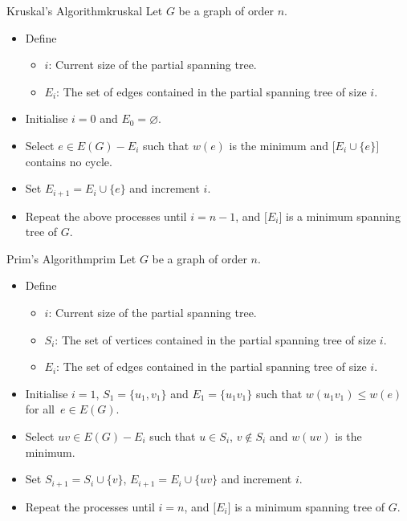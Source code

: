 \documentclass[math]{amznotes}
\theoremstyle{remark}
\newcommand{\0}{\mathbf{0}}
\newcommand{\1}{\mathbf{1}}
\begin{document}
\begin{tecbox}{Kruskal's Algorithm}{kruskal}
    Let $G$ be a graph of order $n$. 
    \begin{itemize}
        \item Define 
        \begin{itemize}
            \item $i$: Current size of the partial spanning tree.
            \item $E_i$: The set of edges contained in the partial spanning tree of size $i$.
        \end{itemize}
        \item Initialise $i = 0$ and $E_0 = \varnothing$.
        \item Select $e \in E(G) - E_i$ such that $w(e)$ is the minimum and $\bigl[E_i \cup \{e\}\bigr]$ contains no cycle.
        \item Set $E_{i + 1} = E_i \cup \{e\}$ and increment $i$.
        \item Repeat the above processes until $i = n - 1$, and $\bigl[E_i\bigr]$ is a minimum spanning tree of $G$.
    \end{itemize}
\end{tecbox}
\begin{tecbox}{Prim's Algorithm}{prim}
    Let $G$ be a graph of order $n$. 
    \begin{itemize}
        \item Define 
        \begin{itemize}
            \item $i$: Current size of the partial spanning tree.
            \item $S_i$: The set of vertices contained in the partial spanning tree of size $i$.
            \item $E_i$: The set of edges contained in the partial spanning tree of size $i$.
        \end{itemize}
        \item Initialise $i = 1$, $S_1 = \{u_1, v_1\}$ and $E_1 = \{u_1v_1\}$ such that $w(u_1v_1) \leq w(e)$ for all~$e \in E(G)$.
        \item Select $uv \in E(G) - E_i$ such that $u \in S_i$, $v\notin S_i$ and $w(uv)$ is the minimum.
        \item Set $S_{i + 1} = S_i \cup \{v\}$, $E_{i + 1} = E_i \cup \{uv\}$ and increment $i$.
        \item Repeat the processes until $i = n$, and $\bigl[E_i\bigr]$ is a minimum spanning tree of $G$.
    \end{itemize}
\end{tecbox}
\end{document}
